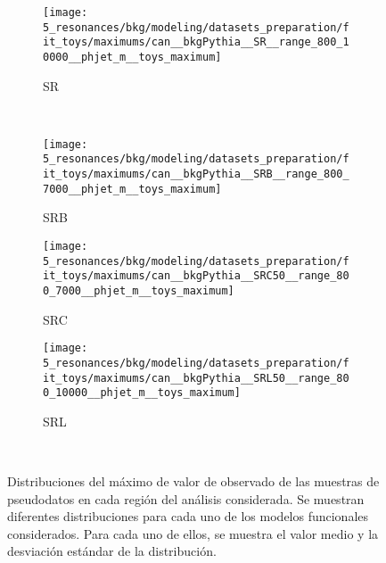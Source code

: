 \begin{figure}[ht!]
    \centering
    \begin{subfigure}[h]{0.32\linewidth}
        \centering
        \texttt{[image: 5\_resonances/bkg/modeling/datasets\_preparation/fit\_toys/maximums/can\_\_bkgPythia\_\_SR\_\_range\_800\_10000\_\_phjet\_m\_\_toys\_maximum]}
        \caption{SR}
    \end{subfigure}\\
    \begin{subfigure}[h]{0.32\linewidth}
        \centering
        \texttt{[image: 5\_resonances/bkg/modeling/datasets\_preparation/fit\_toys/maximums/can\_\_bkgPythia\_\_SRB\_\_range\_800\_7000\_\_phjet\_m\_\_toys\_maximum]}
        \caption{SRB}
    \end{subfigure}
    \begin{subfigure}[h]{0.32\linewidth}
        \centering
        \texttt{[image: 5\_resonances/bkg/modeling/datasets\_preparation/fit\_toys/maximums/can\_\_bkgPythia\_\_SRC50\_\_range\_800\_7000\_\_phjet\_m\_\_toys\_maximum]}
        \caption{SRC}
    \end{subfigure}
    \begin{subfigure}[h]{0.32\linewidth}
        \centering
        \texttt{[image: 5\_resonances/bkg/modeling/datasets\_preparation/fit\_toys/maximums/can\_\_bkgPythia\_\_SRL50\_\_range\_800\_10000\_\_phjet\_m\_\_toys\_maximum]}
        \caption{SRL}
    \end{subfigure}\\
    \caption{Distribuciones del máximo de valor de \myj observado de las muestras de pseudodatos en cada región del análisis considerada. Se muestran diferentes distribuciones para cada uno de los modelos funcionales considerados. Para cada uno de ellos, se muestra el valor medio y la desviación estándar de la distribución.}
    \label{fig:bkg:modeling:preparation:toys:toys_maximums}
\end{figure}

